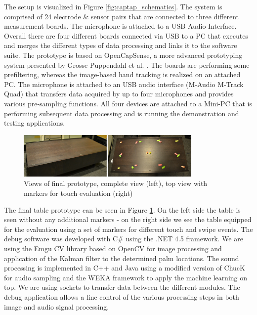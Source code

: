 The setup is visualized in Figure \ref{fig:captap_schematics}. The system is comprised of 24 electrode \& sensor pairs that are connected to three different measurement boards. The microphone is attached to a USB Audio Interface. Overall there are four different boards connected via USB to a  PC that executes and merges the different types of data processing and links it to the software suite. The prototype is based on OpenCapSense, a more advanced prototyping system presented by Grosse-Puppendahl et al. \cite{grosse2013opencapsense}. The boards are performing some prefiltering, whereas the image-based hand tracking is realized on an attached PC. The microphone is attached to an USB audio interface (M-Audio M-Track Quad) that transfers data acquired by up to four microphones and provides various pre-sampling functions. All four devices are attached to a Mini-PC that is performing subsequent data processing and is running the demonstration and testing applications. 
 
\begin{figure}[ht]
\centering
\includegraphics[width=0.8\textwidth]{images/table_final_view}
\caption{Views of final prototype, complete view (left), top view with markers for touch evaluation (right)}
\label{fig:table_final_view}
\end{figure}

The final table prototype can be seen in Figure \ref{fig:table_final_view}. On the left side the table is seen without any additional markers - on the right side we see the table equipped for the evaluation using a set of markers for different touch and swipe events. The debug software was developed with C\# using the .NET 4.5 framework. We are using the Emgu CV library based on OpenCV for image processing and application of the Kalman filter to the determined palm locations. The sound processing is implemented in C++ and Java using a modified version of ChucK for audio sampling and the WEKA framework to apply the machine learning on top. We are using sockets to transfer data between the different modules. The debug application allows a fine control of the various processing steps in both image and audio signal processing.

